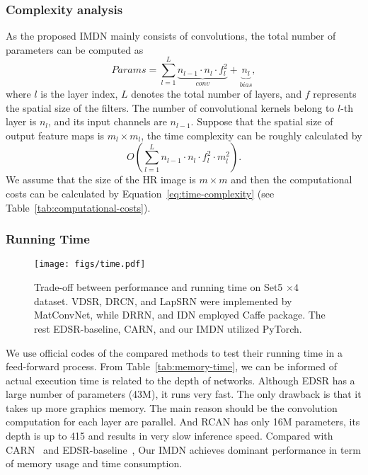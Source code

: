 \documentclass[sigconf]{acmart}
\begin{document}
\subsubsection{Complexity analysis}
As the proposed IMDN mainly consists of convolutions, the total number of parameters can be computed as
\begin{equation}
Params = \sum\limits_{l = 1}^L {\underbrace {{n_{l - 1}} \cdot {n_l} \cdot f_l^2}_{conv} + \underbrace {{n_l}}_{bias}} ,
\end{equation}
where $l$ is the layer index, $L$ denotes the total number of layers, and $f$ represents the spatial size of the filters. The number of convolutional kernels belong to $l$-th layer is $n_l$, and its input channels are $n_{l-1}$. Suppose that the spatial size of output feature maps is $m_l \times m_l$, the time complexity can be roughly calculated by
\begin{equation}\label{eq:time-complexity}
O\left( {\sum\limits_{l = 1}^L {{n_{l - 1}} \cdot {n_l} \cdot f_l^2 \cdot m_l^2} } \right).
\end{equation}
We assume that the size of the HR image is $m \times m$ and then the computational costs can be calculated by Equation~\ref{eq:time-complexity} (see Table~\ref{tab:computational-costs}).

\subsubsection{Running Time}
\begin{figure}[htpb]
	\centering
	\texttt{[image: figs/time.pdf]}
	\vspace{-1mm}
	\caption{Trade-off between performance and running time on Set5 $\times 4$ dataset. VDSR, DRCN, and LapSRN were implemented by MatConvNet, while DRRN, and IDN employed Caffe package. The rest EDSR-baseline, CARN, and our IMDN utilized PyTorch.}
	\label{fig:time}
	\vspace{-1mm}
\end{figure}

We use official codes of the compared methods to test their running time in a feed-forward process. From Table~\ref{tab:memory-time}, we can be informed of actual execution time is related to the depth of networks. Although EDSR has a large number of parameters (43M), it runs very fast. The only drawback is that it takes up more graphics memory. The main reason should be the convolution computation for each layer are parallel. And RCAN has only 16M parameters, its depth is up to 415 and results in very slow inference speed. Compared with CARN~\cite{CARN} and EDSR-baseline~\cite{EDSR}, Our IMDN achieves dominant performance in term of memory usage and time consumption.
\end{document}

